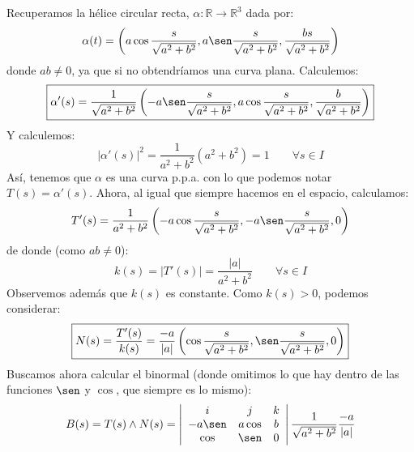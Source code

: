 \begin{ejemplo}
    \item[4.] Recuperamos la hélice circular recta, $\alpha:\mathbb{R}\to \mathbb{R}^3$ dada por:
        \begin{equation*}
            \alpha(t) = \left(a\cos \frac{s}{\sqrt{a^2+b^2}}, a\sen \frac{s}{\sqrt{a^2+b^2}}, \frac{bs}{\sqrt{a^2+b^2}}\right)
        \end{equation*}
        donde $ab\neq 0$, ya que si no obtendríamos una curva plana. Calculemos:
        \begin{equation*}
            \boxed{\alpha'(s) = \frac{1}{\sqrt{a^2+b^2}}\left(-a\sen\frac{s}{\sqrt{a^2+b^2}}, a\cos \frac{s}{\sqrt{a^2+b^2}}, \frac{b}{\sqrt{a^2+b^2}}\right)}
        \end{equation*}
        Y calculemos:
        \begin{equation*}
            |\alpha'(s)|^2 = \frac{1}{a^2+b^2}(a^2 + b^2) = 1 \qquad \forall s\in I
        \end{equation*}
        Así, tenemos que $\alpha$ es una curva p.p.a. con lo que podemos notar $T(s) = \alpha'(s)$. Ahora, al igual que siempre hacemos en el espacio, calculamos:
        \begin{equation*}
            T'(s) = \frac{1}{a^2+b^2} \left(-a\cos \frac{s}{\sqrt{a^2+b^2}}, -a\sen \frac{s}{\sqrt{a^2+b^2}},0\right)
        \end{equation*}
        de donde (como $ab\neq 0$):
        \begin{equation*}
            \boxed{k(s) = |T'(s)| = \frac{|a|}{a^2 + b^2}}  \qquad \forall s\in I
        \end{equation*}
        Observemos además que $k(s)$ es constante. Como $k(s)>0$, podemos considerar:
        \begin{equation*}
            \boxed{N(s) = \frac{T'(s)}{k(s)} = \frac{-a}{|a|} \left(\cos\frac{s}{\sqrt{a^2+b^2}}, \sen\frac{s}{\sqrt{a^2+b^2}},0\right)}
        \end{equation*}
        Buscamos ahora calcular el binormal (donde omitimos lo que hay dentro de las funciones $\sen$ y $\cos$, que siempre es lo mismo):
        \begin{align*}
            B(s) &= T(s)\land N(s) = \left|\begin{array}{ccc}
                 i & j & k \\
                 -a\sen & a\cos & b \\
                 \cos & \sen & 0
            \end{array}\right| \frac{1}{\sqrt{a^2+b^2}} \frac{-a}{|a|} \\

\end{align*}
\end{ejemplo}
